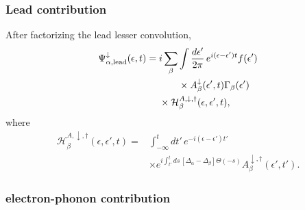 \documentclass[
 reprint,
 superscriptaddress,
 amsmath,amssymb,
 aps,prb,
 longbibliography,
 floatfix
]{revtex4-2}
\begin{document}
\subsubsection{Lead contribution}

After factorizing the lead lesser convolution,
\begin{equation*}
\begin{aligned}
\Psi_{\alpha,\rm lead}^\downarrow(\epsilon,t)
={}&
i\sum_\beta
\int\frac{d\epsilon'}{2\pi}\,
e^{i(\epsilon-\epsilon')t}
f(\epsilon')
\\
&\qquad \times
A_\beta^\downarrow(\epsilon',t)
\Gamma_\beta(\epsilon')
\\
&\times
\mathcal H_\beta^{A,\downarrow,\dagger}
(\epsilon,\epsilon',t),
\end{aligned}
\end{equation*}
where
\begin{equation*}
\begin{aligned}
\mathcal H_\beta^{A,\downarrow,\dagger}
(\epsilon,\epsilon',t)
={}&
\int_{-\infty}^{t}dt'\,
e^{-i(\epsilon-\epsilon')t'}
\\
&\times
e^{i\int_{t'}^t ds\,
[\Delta_\alpha-\Delta_\beta]\Theta(-s)}
A_\beta^{\downarrow,\dagger}(\epsilon',t').
\end{aligned}
\end{equation*}
\subsubsection{electron-phonon contribution}
\end{document}
